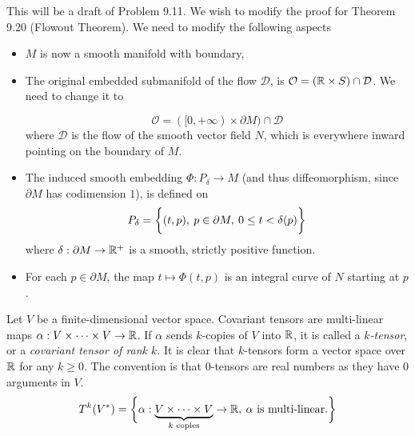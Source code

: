 \documentclass[../main-manifolds.tex]{subfiles}
\begin{document}
\providecommand{\szz}{\mathcal{S}}
\providecommand{\ccinf}{C_c^\infty}

\providecommand{\Taux}{\Tau_\xx}
\providecommand{\Tauy}{\Tau_\yy}
\providecommand{\Tauxy}{\Tau_{\xx\times\yy}}

\providecommand{\Bx}{\borel_\xx}
\providecommand{\By}{\borel_\yy}
\providecommand{\Bxy}{\borel_{\xx\times\yy}}


This will be a draft of Problem 9.11. We wish to modify the proof for Theorem 9.20 (Flowout Theorem). We need to modify the following aspects
\begin{itemize}
    \item $M$ is now a smooth manifold with boundary,
    \item The original embedded submanifold of the flow $\mathcal{D}$, is $\mathcal{O} = (\mathbb{R}\times S)\cap \mathcal{D}$. We need to change it to

    \[
        \mathcal{O} = ([0,+\infty)\times \partial M)\cap \mathcal{D}
    \]
    where $\mathcal{D}$ is the flow of the smooth vector field $N$, which is everywhere inward pointing on the boundary of $M$.
    \item The induced smooth embedding $\Phi: P_\delta\to M$ (and thus diffeomorphism, since $\partial M$ has codimension $1$), is defined on 
    \[
        P_\delta = \biggl\{{(t,p),\: p\in\partial M,\: 0\leq t< \delta(p)}\biggr\}
    \]
    where $\delta:\partial M\to \mathbb{R}^+$ is a smooth, strictly positive function.
    \item For each $p\in \partial M$, the map $t\mapsto \Phi(t,p)$ is an integral curve of $N$ starting at $p$. 
\end{itemize}

\begin{definition}
    Let $V$ be a finite-dimensional vector space. Covariant tensors are multi-linear maps $\alpha: V\times \cdots \times V\to \mathbb{R}$. If $\alpha$ sends $k$-copies of $V$ into $\mathbb{R}$, it is called a \emph{$k$-tensor}, or a \emph{covariant tensor of rank $k$}. It is clear that $k$-tensors form a vector space over $\mathbb{R}$ for any $k\geq 0$. The convention is that $0$-tensors are real numbers as they have $0$ arguments in $V$. 
    \[
        T^{k}(V^*) = \biggl\{{\alpha: \underbrace{V\times\cdots\times V}_{k\text{ copies}}\to\mathbb{R},\: \alpha\text{ is multi-linear.}}\biggr\}
    \]
\end{definition}
\end{document}
